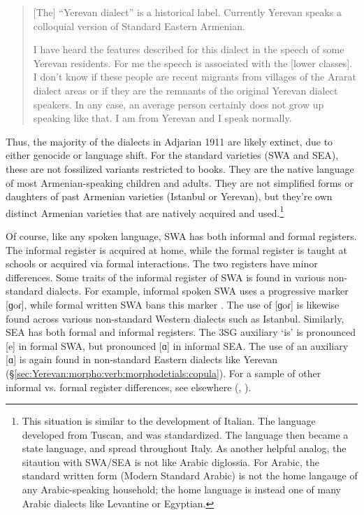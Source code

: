 \begin{quote}
	[The] ``Yerevan dialect'' is a historical label. Currently Yerevan speaks a colloquial version of Standard Eastern Armenian.
	
	I have heard the features described for this dialect in the speech of some Yerevan residents. For me the speech is associated with the [lower classes]. I don't know if these people are recent migrants from villages of the Ararat dialect areas or if they are the remnants of the original Yerevan dialect speakers. In any case, an average person certainly does not grow up speaking like that. I am from Yerevan and I speak normally. 
\end{quote}

Thus, the majority of the dialects in Adjarian 1911 are likely extinct, due to either genocide or language shift. For the standard varieties (SWA and SEA), these are not fossilized variants restricted to books. They are the native language of most Armenian-speaking children and adults. They are not simplified forms or daughters of past Armenian varieties (Istanbul or Yerevan), but they're own distinct Armenian varieties that are natively acquired and used.\footnote{This situation is similar to the development of Italian. The language developed from Tuscan, and was standardized. The language then became a state language, and spread throughout Italy. As another helpful analog, the sitaution with SWA/SEA is not like Arabic diglossia. For Arabic, the standard written form (Modern Standard Arabic) is not the home langauge of any Arabic-speaking household; the home language is instead one of many Arabic dialects like Levantine or Egyptian. }





Of course, like any spoken language, SWA has both informal and formal registers. The informal register is acquired at home, while the formal register is taught at schools or acquired via formal interactions. The two registers have minor differences. Some traits of the informal register of SWA is found in various non-standard dialects. For example, informal spoken SWA uses a progressive marker [ɡoɾ], while formal written SWA bans this marker \citep{donabedian-2001-tabouLinguisticArmenianOccidentalGorProgressive}. The use of [ɡoɾ] is likewise found across various non-standard Western dialects such as Istanbul. Similarly, SEA has both formal and informal registers. The 3SG auxiliary `is' is pronounced [e] in formal SWA, but pronounced [ɑ] in informal SEA. The use of an auxiliary [ɑ] is again found in non-standard Eastern dialects like Yerevan (\S\ref{sec:Yerevan:morpho:verb:morphodetials:copula}). For a sample of other informal vs. formal register differences, see elsewhere (\citealt{Gharagyulyan-1981-ColloquialArmenian,Zakaryan-1981-ColloquialArmenian,Aghayan-1981-ColloquialArmenian,Kavassian-1983-CertainProblemMorphologyArmenianMontreal,DumTragut-2009-ArmenianReferenceGrammar}, \citealt[ch3]{Karapetian-2014-TeachArmenianEasternArmenianHeritage}).



